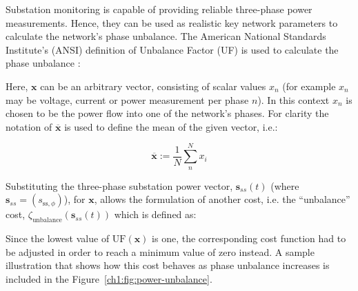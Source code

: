 
Substation monitoring is capable of providing reliable three-phase power measurements.
Hence, they can be used as realistic key network parameters to calculate the network's phase unbalance.
The American National Standards Institute's (ANSI) definition of Unbalance Factor (UF) is used to calculate the phase unbalance \cite{ANSI-MB-1-2011}:



Here, $\textbf{x}$ can be an arbitrary vector, consisting of scalar values $x_n$ (for example $x_n$ may be voltage, current or power measurement per phase $n$).
In this context $x_n$ is chosen to be the power flow into one of the network's phases.
For clarity the notation of $\overline{\textbf{x}}$ is used to define the mean of the given vector, i.e.:

\begin{equation}
	\overline{\textbf{x}} := \frac{1}{N}\sum_n^N{x_i}
\end{equation}


Substituting the three-phase substation power vector, $\textbf{s}_{ss}(t)$ (where $\textbf{s}_{ss} = (s_{\text{ss},\phi})$), for $\textbf{x}$, allows the formulation of another cost, i.e. the ``unbalance'' cost, $\zeta_\text{unbalance}(\textbf{s}_{ss}(t))$ which is defined as:



Since the lowest value of $\text{UF}(\textbf{x})$ is one, the corresponding cost function had to be adjusted in order to reach a minimum value of zero instead.
A sample illustration that shows how this cost behaves as phase unbalance increases is included in the Figure~\ref{ch1:fig:power-unbalance}.

